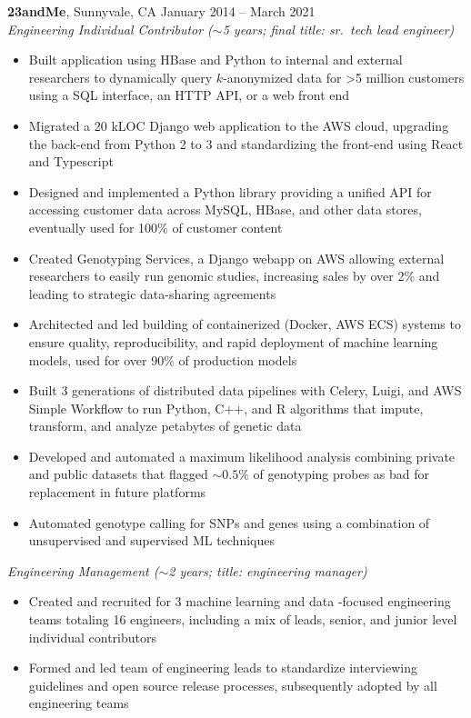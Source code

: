 \documentclass[margin,line]{resume}
\begin{document}
\begin{resume}
    \textbf{23andMe}, Sunnyvale, CA \hfill\vspace{1mm}\hfill January 2014 -- March 2021\\%
    \textsl{Engineering Individual Contributor (\(\sim\)5 years; final title: sr.\ tech lead engineer)}
    \begin{itemize}
    \item Built application using HBase and Python to internal and external researchers to dynamically query \(k\)-anonymized data for \textgreater 5 million customers using a SQL interface,  an HTTP API, or a web front end
    \item Migrated a 20 kLOC Django web application to the AWS cloud, upgrading the back-end from Python 2 to 3 and standardizing the front-end using React and Typescript
    \item Designed and implemented a Python library providing a unified API for accessing customer data across MySQL, HBase, and other data stores, eventually used for 100\% of customer content
    \item Created Genotyping Services, a Django webapp on AWS allowing external researchers to easily run genomic studies, increasing sales by over 2\% and leading to strategic data-sharing agreements
    \item Architected and led building of containerized (Docker, AWS ECS) systems to ensure quality, reproducibility, and rapid deployment of machine learning models, used for over 90\% of production models
    \item Built 3 generations of distributed data pipelines with Celery, Luigi, and AWS Simple Workflow to run Python, C++, and R algorithms that impute, transform, and analyze petabytes of genetic data
    \item Developed and automated a maximum likelihood analysis combining private and public datasets that flagged \(\sim0.5\%\) of genotyping probes as bad for replacement in future platforms
    \item Automated genotype calling for SNPs and genes using a combination of unsupervised and supervised ML techniques
    \end{itemize}
    \textsl{Engineering Management (\(\sim\)2 years; title: engineering manager)}
    \begin{itemize}
    \item Created and recruited for 3 machine learning and data -focused engineering teams totaling 16 engineers, including a mix of leads, senior, and junior level individual contributors
    \item Formed and led team of engineering leads to standardize interviewing guidelines and open source release processes, subsequently adopted by all engineering teams
    \end{itemize}
    

\end{resume}
\end{document}
